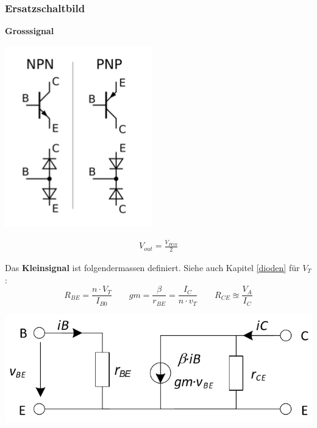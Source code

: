 \subsubsection{Ersatzschaltbild}
\noindent\textbf{Grosssignal}\\
\begin{minipage}{0.20\textwidth}
	\includegraphics[width=\linewidth,keepaspectratio=true]{./Images/transitor_kleinsignal}
\end{minipage}%
\begin{minipage}{0.30\textwidth}
	\begin{align*}
		V_{out} = \frac{V_{POS}}{2}
	\end{align*}
\end{minipage}

\noindent Das \textbf{Kleinsignal} ist folgendermassen definiert. Siehe auch Kapitel \ref{dioden} für $V_T$: 
\[
R_{BE} = \frac{n\cdot V_T}{I_{B0}} \qquad gm = \frac{\beta}{r_{BE}} = \frac{I_C}{n\cdot v_T} \qquad R_{CE} \approxeq \frac{V_A}{I_C}
\]

\begin{center}
	\includegraphics[width=\columnwidth,keepaspectratio=true]{Images/bjt_esb}
\end{center}



